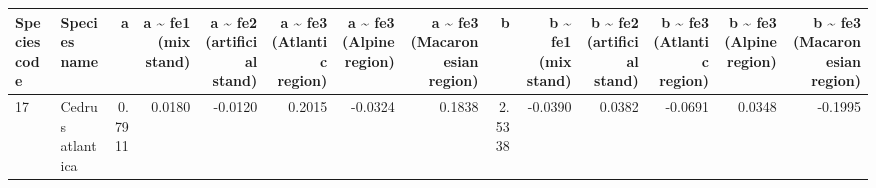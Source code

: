 \begin{table}[ht]
\centering
\begin{tabular}{llrrrrrrrrrrrr}
  \hline
Species code & Species name & a & a \~{} fe1 (mix stand) & a \~{} fe2 (artificial stand) & a \~{} fe3 (Atlantic region) & a \~{} fe3 (Alpine region) & a \~{} fe3 (Macaronesian region) & b & b \~{} fe1 (mix stand) & b \~{} fe2 (artificial stand) & b \~{} fe3 (Atlantic region) & b \~{} fe3 (Alpine region) & b \~{} fe3 (Macaronesian region) \\ 
  \hline
17 & Cedrus atlantica & 0.7911 & 0.0180 & -0.0120 & 0.2015 & -0.0324 & 0.1838 & 2.5338 & -0.0390 & 0.0382 & -0.0691 & 0.0348 & -0.1995 \\ 
   \hline
\end{tabular}
\end{table}
